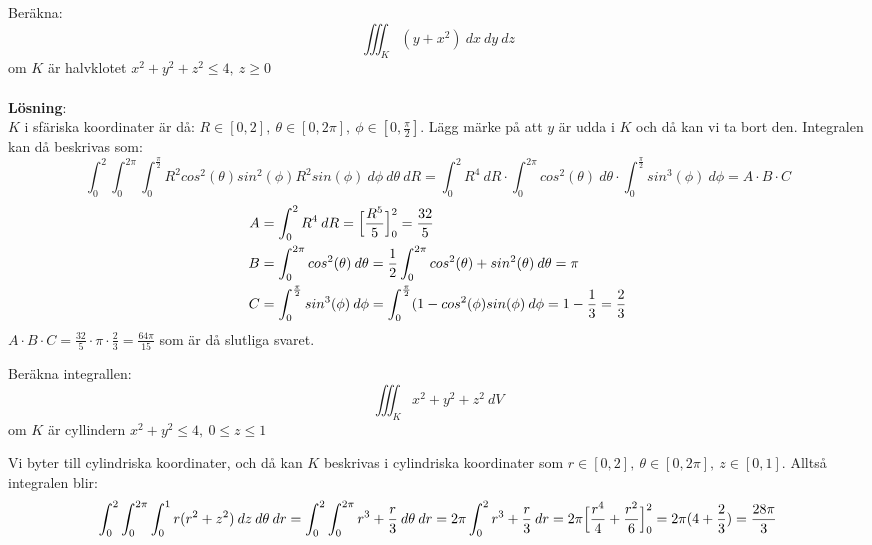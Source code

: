 \documentclass{report}
\begin{document}
\ex{}
{
Beräkna:
\begin{equation*}
\iiint_{K}^{} (y+x^2) \: dx  \: dy  \: dz 
\end{equation*}
om $ K $ är halvklotet $ x^2+y^2 +z^2 \le 4, \: z \ge 0 $\\\\

\textbf{Lösning}:\\
$ K $ i sfäriska koordinater är då: $ R \in [0,2], \: \theta \in [0, 2\pi], \: \phi \in [0, \frac{\pi}{2} ]$. Lägg märke på att $ y $ är udda i $ K $ och då kan vi ta bort den. Integralen kan då beskrivas som:
\begin{equation*}
\int_{0}^{2} \int_{0}^{2\pi} \int_{0}^{ \frac{\pi}{2} } R^2cos^2(\theta)sin^2(\phi)R^2sin(\phi) \: d\phi  \: d\theta \: dR = \int_{0}^{2} R^4 \: dR \cdot \int_{0}^{2\pi} cos^2(\theta) \: d\theta \cdot \int_{0}^{ \frac{\pi}{2} } sin^3(\phi) \: d\phi = A \cdot B \cdot C  
\end{equation*}
\begin{align*}
	A &= \int_{0}^{2} R^4 \: dR = \Bigl[ \frac{R^5}{5}   \Bigr]_{0}^{2} = \frac{32}{5} \\
	B &= \int_{0}^{2\pi} cos^2(\theta) \: d\theta = \frac{1}{2} \int_{0}^{2\pi} cos^2(\theta)+sin^2(\theta) \: d\theta = \pi\\
	C &= \int_{0}^{ \frac{\pi}{2} } sin^3(\phi) \: d\phi = \int_{0}^{ \frac{\pi}{2}} (1 - cos^2(\phi)sin(\phi)  \: d\phi = 1 - \frac{1}{3} = \frac{2}{3}   
\end{align*}
$ A \cdot B \cdot C = \frac{32}{5} \cdot \pi \cdot \frac{2}{3} = \frac{64\pi}{15}  $ som är då slutliga svaret. 
}

\vspace{20pt}
\qs{}
{
Beräkna integrallen:
\begin{equation*}
	\iiint_{K}^{} x^2+y^2+z^2 \: dV 
\end{equation*}
om $ K $ är cyllindern $ x^2+y^2 \le 4, \: 0 \le z \le 1 $ 
}

\sol Vi byter till cylindriska koordinater, och då kan $ K $ beskrivas i cylindriska koordinater som $ r \in [0, 2], \: \theta \in [0,2\pi], \: z \in [0,1] $. Alltså integralen blir:
\begin{equation*}
	\int_{0}^{2} \int_{0}^{2\pi} \int_{0}^{1} r(r^2+z^2) \: dz  \: d\theta  \: dr = \int_{0}^{2} \int_{0}^{2\pi} r^3+ \frac{r}{3}  \: d\theta  \: dr = 2\pi \int_{0}^{2} r^3 + \frac{r}{3}  \: dr = 2\pi \Bigl[ \frac{r^4}{4} + \frac{r^2}{6}   \Bigr]_{0}^{2} = 2\pi(4 + \frac{2}{3}) = \frac{28\pi}{3}    
\end{equation*}
\end{document}
